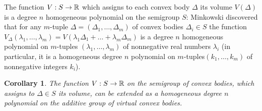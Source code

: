 \documentclass[11pt]{article}
\theoremstyle{plain}
\newtheorem{corollary}[theorem]{Corollary}
\theoremstyle{definition}
\begin{document}
The function $V:S\to \Bbb R$ which assigns to each convex body $\Delta$ its volume $V(\Delta)$ is a degree $n$ homogeneous polynomial on the semigroup $S$: Minkowski discovered that for any $m$-tuple $\Delta=(\Delta_1,\dots, \Delta_m)$  of convex bodies  $\Delta_i\in S$   the function $V_\Delta(\lambda_1,\dots, \lambda_m)= V(\lambda_1\Delta_1+\dots+ \lambda_m\Delta_m)$ is a degree $n$ homogeneous polynomial on $m$-tuples $(\lambda_1,\dots,\lambda_m)$ of nonnegative real numbers  $\lambda_i $ (in particular, it is a homogeneous  degree $n$ polynomial on $m$-tuples$(k_1,\dots,k_m)$  of nonnegative integers  $k_i$).

\begin{corollary} The function $V:S\to \Bbb R$ on the semigroup of convex bodies, which assigns to $\Delta\in S$ its volume, can be extended as a homogeneous degree $n$ polynomial on the additive  group of virtual convex bodies.
\end{corollary}
\end{document}
